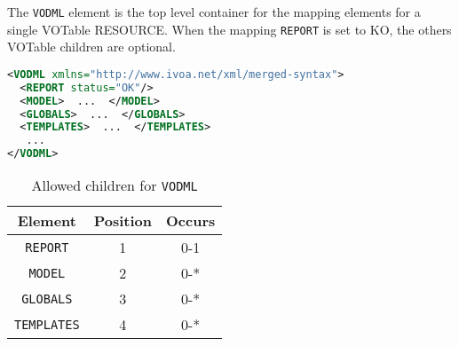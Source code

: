 The \texttt{VODML} element is the top level container for the mapping elements for a single VOTable RESOURCE.
When the mapping \texttt{REPORT} is set to KO, the others  VOTable children are optional.

\begin{lstlisting}[caption={Example \texttt{VODML} mapping block},language=XML]
<VODML xmlns="http://www.ivoa.net/xml/merged-syntax">
  <REPORT status="OK"/>
  <MODEL>  ...  </MODEL>
  <GLOBALS>  ...  </GLOBALS>
  <TEMPLATES>  ...  </TEMPLATES>
   ...
</VODML>
\end{lstlisting}

\begin{table}[!htbp]
  \small
  \centering
  \begin{tabulary}{\linewidth}{|c |c |c|}
    \hline 
        \textbf{Element} &
        \textbf{Position} &
        \textbf{Occurs}\\
    \hline
    \hline  
      \texttt{REPORT} &           
      1 &           
      0-1\\
    \hline  
      \texttt{MODEL} &           
      2 &           
      0-*\\
    \hline    
      \texttt{GLOBALS} &           
      3 &           
      0-*\\
    \hline  
      \texttt{TEMPLATES} &           
      4 &           
      0-*\\
    \hline 
  \end{tabulary}
    \caption{Allowed children for \texttt{VODML}} 
    \label{tbl:vodml-children}
\end{table}


